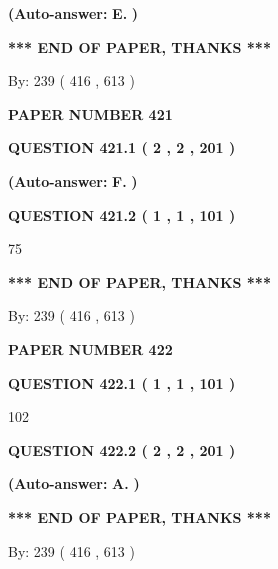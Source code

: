 \documentclass[12pt]{article}
\begin{document}
 
{\textbf{(Auto-answer:}}
{\textbf{\large{
E.}}}
{\textbf{)}}
 
 
   
   
   
   
\vspace{1.0in} 
{\textbf{\large{ *** END OF PAPER, THANKS *** }}} 
   
   
\hspace{1.0in} By: 
 239 ( 416 ,  613 )
   
   
   
   
\newpage 
\setcounter{page}{ 
   421001 } 
   
   
 {\textbf{ \Large{ PAPER NUMBER  421  }}}
   
   
   
   
  
  
{\textbf{\large{QUESTION
421.1 
 ( 2 , 2 , 201 )
}}}
 
 
{\textbf{(Auto-answer:}}
{\textbf{\large{
F.}}}
{\textbf{)}}
 
 
  
  
{\textbf{\large{QUESTION
421.2 
 ( 1 , 1 , 101 )
}}}

75
   
   
   
   
\vspace{1.0in} 
{\textbf{\large{ *** END OF PAPER, THANKS *** }}} 
   
   
\hspace{1.0in} By: 
 239 ( 416 ,  613 )
   
   
   
   
\newpage 
\setcounter{page}{ 
   422001 } 
   
   
 {\textbf{ \Large{ PAPER NUMBER  422  }}}
   
   
   
   
  
  
{\textbf{\large{QUESTION
422.1 
 ( 1 , 1 , 101 )
}}}

102
  
  
{\textbf{\large{QUESTION
422.2 
 ( 2 , 2 , 201 )
}}}
 
 
{\textbf{(Auto-answer:}}
{\textbf{\large{
A.}}}
{\textbf{)}}
 
 
   
   
   
   
\vspace{1.0in} 
{\textbf{\large{ *** END OF PAPER, THANKS *** }}} 
   
   
\hspace{1.0in} By: 
 239 ( 416 ,  613 )
   
   
   
\end{document}
